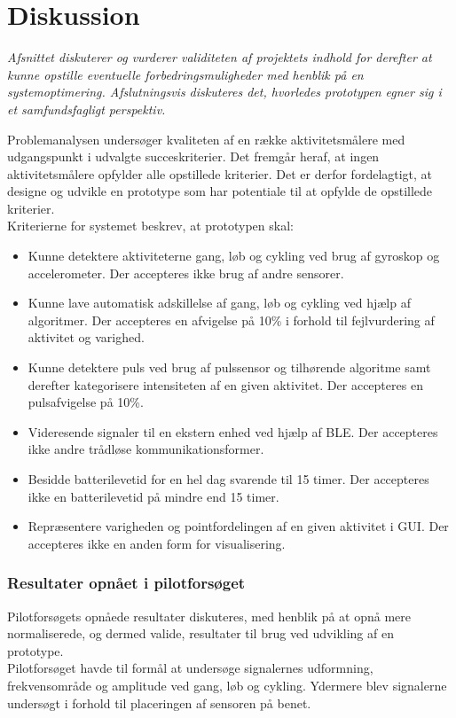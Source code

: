 \section{Diskussion}\label{sec:diskussion}
\textit{Afsnittet diskuterer og vurderer validiteten af projektets indhold for derefter at kunne opstille eventuelle forbedringsmuligheder med henblik på en systemoptimering. Afslutningsvis diskuteres det, hvorledes prototypen egner sig i et samfundsfagligt perspektiv.}

Problemanalysen undersøger kvaliteten af en række aktivitetsmålere med udgangspunkt i udvalgte succeskriterier. Det fremgår heraf, at ingen aktivitetsmålere opfylder alle opstillede kriterier. Det er derfor fordelagtigt, at designe og udvikle en prototype som har potentiale til at opfylde de opstillede kriterier. \\
Kriterierne for systemet beskrev, at prototypen skal:
\begin{itemize}
	\item Kunne detektere aktiviteterne gang, løb og cykling ved brug af gyroskop og accelerometer. Der accepteres ikke brug af andre sensorer.
	\item Kunne lave automatisk adskillelse af gang, løb og cykling ved hjælp af algoritmer. Der accepteres en afvigelse på 10\% i forhold til fejlvurdering af aktivitet og varighed.
	\item Kunne detektere puls ved brug af pulssensor og tilhørende algoritme samt derefter kategorisere intensiteten af en given aktivitet. Der accepteres en pulsafvigelse på 10\%.
	\item Videresende signaler til en ekstern enhed ved hjælp af BLE. Der accepteres ikke andre trådløse kommunikationsformer.
	\item Besidde batterilevetid for en hel dag svarende til 15 timer. Der accepteres ikke en batterilevetid på mindre end 15 timer.
	\item Repræsentere varigheden og pointfordelingen af en given aktivitet i GUI. Der accepteres ikke en anden form for visualisering. 
\end{itemize}

\subsubsection{Resultater opnået i pilotforsøget}
Pilotforsøgets opnåede resultater diskuteres, med henblik på at opnå mere normaliserede, og dermed valide, resultater til brug ved udvikling af en prototype.\\
Pilotforsøget havde til formål at undersøge signalernes udformning, frekvensområde og amplitude ved gang, løb og cykling. Ydermere blev signalerne undersøgt i forhold til placeringen af sensoren på benet. 


